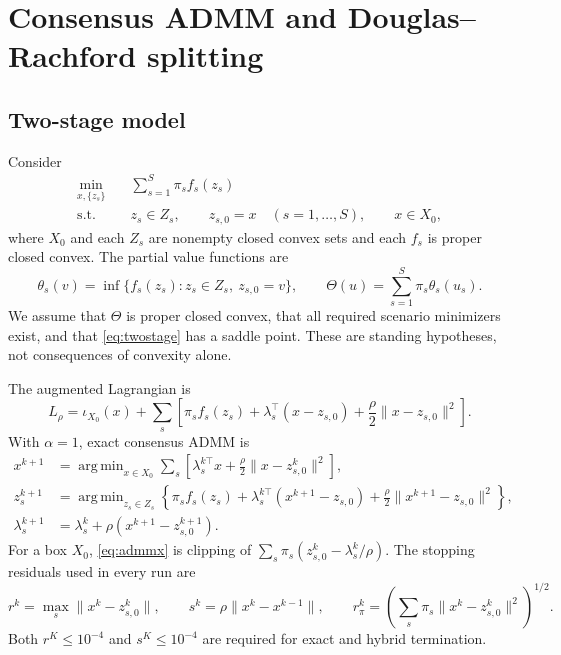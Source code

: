 \documentclass[preprint,12pt,3p]{elsarticle}
\theoremstyle{definition}
\DeclareMathOperator*{\argmin}{arg\,min}
\begin{document}
\section{Consensus ADMM and Douglas--Rachford splitting}
\subsection{Two-stage model}
Consider
\begin{align}
\min_{x,\{z_s\}}\quad &\sum_{s=1}^S\pi_s f_s(z_s)\nonumber\\
\mathrm{s.t.}\quad &z_s\in Z_s,\qquad z_{s,0}=x\quad(s=1,\ldots,S),\qquad x\in X_0,
\label{eq:twostage}
\end{align}
where $X_0$ and each $Z_s$ are nonempty closed convex sets and each $f_s$ is proper closed convex. The partial value functions are
\[
\theta_s(v)=\inf\{f_s(z_s):z_s\in Z_s,\ z_{s,0}=v\},\qquad
\Theta(u)=\sum_{s=1}^S\pi_s\theta_s(u_s).
\]
We assume that $\Theta$ is proper closed convex, that all required scenario minimizers exist, and that \eqref{eq:twostage} has a saddle point. These are standing hypotheses, not consequences of convexity alone.

The augmented Lagrangian is
\[
L_\rho=\iota_{X_0}(x)+\sum_s\left[\pi_s f_s(z_s)+\lambda_s^\top(x-z_{s,0})+\frac{\rho}{2}\|x-z_{s,0}\|^2\right].
\]
With $\alpha=1$, exact consensus ADMM is
\begin{align}
x^{k+1}&=\argmin_{x\in X_0}\sum_s\left[\lambda_s^{k\top}x+\frac{\rho}{2}\|x-z_{s,0}^k\|^2\right],\label{eq:admmx}\\
z_s^{k+1}&=\argmin_{z_s\in Z_s}\left\{\pi_s f_s(z_s)+\lambda_s^{k\top}(x^{k+1}-z_{s,0})+\frac{\rho}{2}\|x^{k+1}-z_{s,0}\|^2\right\},\label{eq:admmz}\\
\lambda_s^{k+1}&=\lambda_s^k+\rho(x^{k+1}-z_{s,0}^{k+1}).\label{eq:admmlam}
\end{align}
For a box $X_0$, \eqref{eq:admmx} is clipping of $\sum_s\pi_s(z_{s,0}^k-\lambda_s^k/\rho)$. The stopping residuals used in every run are
\begin{equation}
r^k=\max_s\|x^k-z_{s,0}^k\|,\qquad
s^k=\rho\|x^k-x^{k-1}\|,\qquad
r_\pi^k=\left(\sum_s\pi_s\|x^k-z_{s,0}^k\|^2\right)^{1/2}.
\label{eq:residuals}
\end{equation}
Both $r^K\leq10^{-4}$ and $s^K\leq10^{-4}$ are required for exact and hybrid termination.
\end{document}
